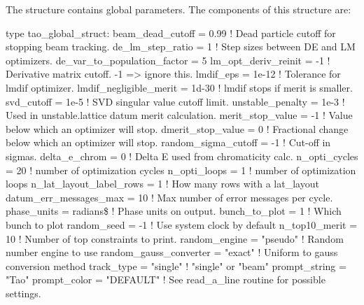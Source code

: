 {{{{{{{{
The  structure contains \tao global parameters. The components of this structure are:
\begin{example}
type tao_global_struct:
  beam_dead_cutoff = 0.99          ! Dead particle cutoff for stopping beam tracking.
  de_lm_step_ratio = 1             ! Step sizes between DE and LM optimizers.
  de_var_to_population_factor = 5 
  lm_opt_deriv_reinit = -1         ! Derivative matrix cutoff. -1 => ignore this.
  lmdif_eps = 1e-12                ! Tolerance for lmdif optimizer.
  lmdif_negligible_merit = 1d-30   ! lmdif stops if merit is smaller.
  svd_cutoff = 1e-5                ! SVD singular value cutoff limit.
  unstable_penalty = 1e-3          ! Used in unstable.lattice datum merit calculation.
  merit_stop_value = -1            ! Value below which an optimizer will stop.
  dmerit_stop_value = 0            ! Fractional change below which an optimizer will stop.
  random_sigma_cutoff = -1         ! Cut-off in sigmas.
  delta_e_chrom = 0                ! Delta E used from chromaticity calc.
  n_opti_cycles = 20               ! number of optimization cycles
  n_opti_loops = 1                 ! number of optimization loops
  n_lat_layout_label_rows = 1      ! How many rows with a lat_layout
  datum_err_messages_max = 10      ! Max number of error messages per cycle.
  phase_units = radians\$          ! Phase units on output.
  bunch_to_plot = 1                ! Which bunch to plot
  random_seed = -1                 ! Use system clock by default
  n_top10_merit = 10               ! Number of top constraints to print.
  random_engine = "pseudo"         ! Random number engine to use
  random_gauss_converter = "exact" ! Uniform to gauss conversion method
  track_type = "single"            ! "single" or "beam" 
  prompt_string = "Tao"
  prompt_color = "DEFAULT"         ! See read_a_line routine for possible settings.

\end{example}}}}}}}}}
